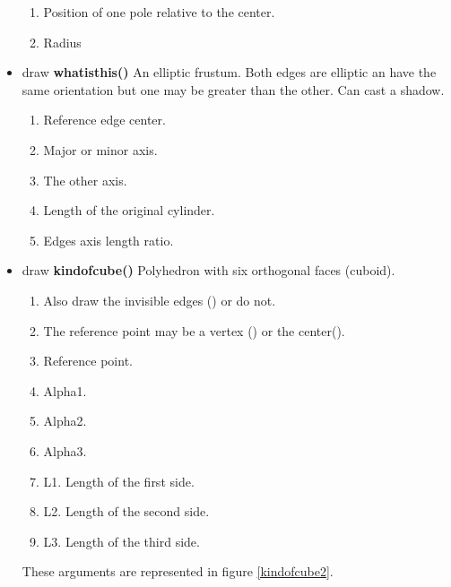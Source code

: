 \begin{itemize}
\begin{enumerate}
\item {} Position of one pole relative to the center.
\item {} Radius
\end{enumerate}
\item draw {\bfseries whatisthis()} An elliptic
frustum. Both edges are elliptic an have the same
orientation but one may be greater than the other.
Can cast a shadow.
\begin{enumerate}
\item {} Reference edge center.
\item {} Major or minor axis.
\item {} The other axis.
\item {} Length of the original
cylinder.
\item {} Edges axis length ratio.
\end{enumerate}
\item draw {\bfseries kindofcube()} Polyhedron with six
orthogonal faces (cuboid).
\begin{enumerate}
\item {} Also draw the invisible edges
 () or do not.
\item {} The reference point may be a
vertex () or the center().
\item {} Reference point.
\item {} Alpha1.
\item {} Alpha2.
\item {} Alpha3.
\item {} L1. Length of the first side.
\item {} L2. Length of the second side.
\item {} L3. Length of the third side.
\end{enumerate}
These arguments are represented in figure \ref{kindofcube2}.


\end{itemize}
